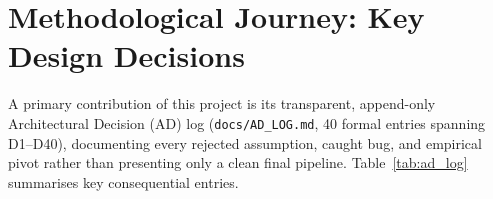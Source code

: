 \documentclass[11pt,a4paper,oneside]{report}
\begin{document}
\chapter[Methodological Journey]{Methodological Journey: Key Design Decisions}
\label{chap:methodological_journey}

A primary contribution of this project is its transparent, append-only Architectural Decision (AD) log (\texttt{docs/AD\_LOG.md}, 40 formal entries spanning D1--D40), documenting every rejected assumption, caught bug, and empirical pivot rather than presenting only a clean final pipeline. Table~\ref{tab:ad_log} summarises key consequential entries.
\end{document}
